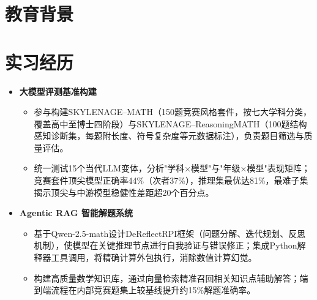 \documentclass{resume}
\begin{document}


\section{教育背景}


\section{实习经历}

\begin{itemize}[parsep=0.5ex]
  \item \textbf{大模型评测基准构建}
  \begin{itemize}[parsep=0.3ex]
    \item 参与构建SKYLENAGE–MATH（150题竞赛风格套件，按七大学科分类，覆盖高中至博士四阶段）与SKYLENAGE–ReasoningMATH（100题结构感知诊断集，每题附长度、符号复杂度等元数据标注），负责题目筛选与质量评估。
    \item 统一测试15个当代LLM变体，分析"学科×模型"与"年级×模型"表现矩阵；竞赛套件顶尖模型正确率44\%（次者37\%），推理集最优达81\%，最难子集揭示顶尖与中游模型稳健性差距超20个百分点。
  \end{itemize}
  \item \textbf{Agentic RAG 智能解题系统}
  \begin{itemize}[parsep=0.3ex]
    \item 基于Qwen-2.5-math设计DeReflectRPI框架（问题分解、迭代规划、反思机制），使模型在关键推理节点进行自我验证与错误修正；集成Python解释器工具调用，将精确计算外包执行，消除数值计算幻觉。
    \item 构建高质量数学知识库，通过向量检索精准召回相关知识点辅助解答；端到端流程在内部竞赛题集上较基线提升约15\%解题准确率。
  \end{itemize}
\end{itemize}
\end{document}
